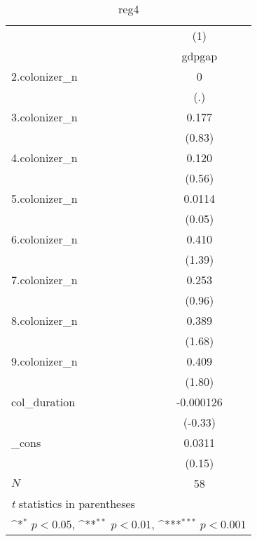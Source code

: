 \begin{table}[htbp]\centering
\def\sym#1{\ifmmode^{#1}\else\(^{#1}\)\fi}
\caption{reg4}
\begin{tabular}{l*{1}{c}}
\hline\hline
            &\multicolumn{1}{c}{(1)}\\
            &\multicolumn{1}{c}{gdpgap}\\
\hline
2.colonizer\_n&           0         \\
            &         (.)         \\
[1em]
3.colonizer\_n&       0.177         \\
            &      (0.83)         \\
[1em]
4.colonizer\_n&       0.120         \\
            &      (0.56)         \\
[1em]
5.colonizer\_n&      0.0114         \\
            &      (0.05)         \\
[1em]
6.colonizer\_n&       0.410         \\
            &      (1.39)         \\
[1em]
7.colonizer\_n&       0.253         \\
            &      (0.96)         \\
[1em]
8.colonizer\_n&       0.389         \\
            &      (1.68)         \\
[1em]
9.colonizer\_n&       0.409         \\
            &      (1.80)         \\
[1em]
col\_duration&   -0.000126         \\
            &     (-0.33)         \\
[1em]
\_cons      &      0.0311         \\
            &      (0.15)         \\
\hline
\(N\)       &          58         \\
\hline\hline
\multicolumn{2}{l}{\footnotesize \textit{t} statistics in parentheses}\\
\multicolumn{2}{l}{\footnotesize \sym{*} \(p<0.05\), \sym{**} \(p<0.01\), \sym{***} \(p<0.001\)}\\
\end{tabular}
\end{table}
